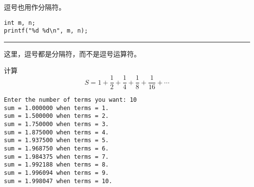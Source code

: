 \begin{frame}[fragile]\ft{\secname}
逗号也用作分隔符。
\begin{lstlisting}
int m, n;
printf("%d %d\n", m, n);
\end{lstlisting}
\rule{\textwidth}{1mm}\pause\vspace{0.1in}

这里，逗号都是分隔符，而不是逗号运算符。
\end{frame}

\begin{frame}[fragile]\ft{\secname}
\begin{li}
计算
$$
S = 1 + \frac12 + \frac14 + \frac18 + \frac1{16} +\cdots 
$$
\end{li}
\end{frame}

\begin{frame}\ft{\secname}

\end{frame}

\begin{frame}[fragile]\ft{\secname}
 \begin{lstlisting}[backgroundcolor=\color{red!10}]
Enter the number of terms you want: 10
sum = 1.000000 when terms = 1.
sum = 1.500000 when terms = 2.
sum = 1.750000 when terms = 3.
sum = 1.875000 when terms = 4.
sum = 1.937500 when terms = 5.
sum = 1.968750 when terms = 6.
sum = 1.984375 when terms = 7.
sum = 1.992188 when terms = 8.
sum = 1.996094 when terms = 9.
sum = 1.998047 when terms = 10.
\end{lstlisting}
\end{frame}
